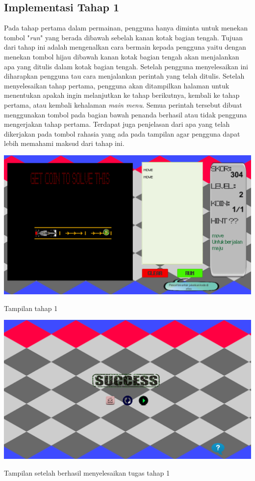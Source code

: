 	\subsection{Implementasi Tahap 1}
	Pada tahap pertama dalam permainan, pengguna hanya diminta untuk menekan tombol "\textit{run}" yang berada dibawah sebelah kanan kotak bagian tengah. Tujuan dari tahap ini adalah mengenalkan cara bermain kepada pengguna yaitu dengan menekan tombol hijau dibawah kanan kotak bagian tengah akan menjalankan apa yang ditulis dalam kotak bagian tengah.
	\linebreak\linebreak
	Setelah pengguna menyelesaikan ini diharapkan pengguna tau cara menjalankan perintah yang telah ditulis. Setelah menyelesaikan tahap pertama, pengguna akan ditampilkan halaman untuk menentukan apakah ingin melanjutkan ke tahap berikutnya, kembali ke tahap pertama, atau kembali kehalaman \textit{main menu}. Semua perintah tersebut dibuat menggunakan tombol pada bagian bawah penanda berhasil atau tidak pengguna mengerjakan tahap pertama. Terdapat juga penjelasan dari apa yang telah dikerjakan pada tombol rahasia yang ada pada tampilan agar pengguna dapat lebih memahami maksud dari tahap ini.
	\begin{table}
		\centering
		\includegraphics[width=\linewidth-40pt]{pics/prototipe/tahap1}
		\caption{Tampilan tahap 1}
	\end{table}
	\begin{table}
		\centering
		\includegraphics[width=\linewidth-40pt]{pics/prototipe/ending1}
		\caption{Tampilan setelah berhasil menyelesaikan tugas tahap 1}
	\end{table}
